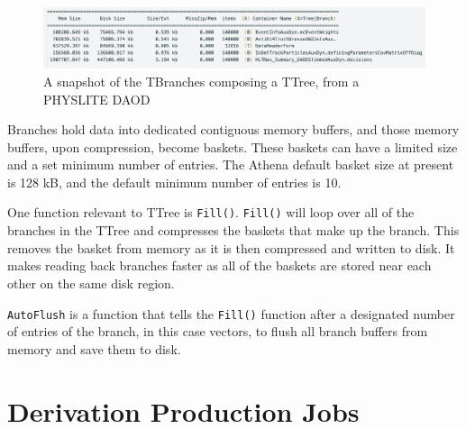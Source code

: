 \begin{figure}[ht]
  \centering
  \includegraphics[width=\textwidth]{content/img/branches_in_TTree.png}
  \caption{A snapshot of the TBranches composing a TTree, from a PHYSLITE DAOD}
  \label{fig:Branches_in_TTree}
\end{figure}

Branches hold data into dedicated contiguous memory buffers, and those memory buffers, upon compression, become baskets.
These baskets can have a limited size and a set minimum number of entries. 
The Athena default basket size at present is 128 kB, and the default minimum number of entries is 10. 

One function relevant to TTree is \verb|Fill()|. 
\verb|Fill()| will loop over all of the branches in the TTree and compresses the baskets that make up the branch.
This removes the basket from memory as it is then compressed and written to disk.
It makes reading back branches faster as all of the baskets are stored near each other on the same disk region. \cite{ROOT_TTree}

\verb|AutoFlush| is a function that tells the \verb|Fill()| function after a designated number of entries of the branch, in this case vectors, to flush all branch buffers from memory and save them to disk. 


\section{Derivation Production Jobs}
 \label{section: ATLASIO_Derivation}


